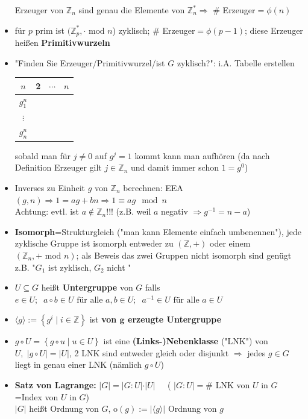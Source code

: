 \documentclass[10pt,a4paper]{article}
\begin{document}
\begin{itemize}
Erzeuger von $\mathbb{Z}_{n}$ sind genau die Elemente von $\mathbb{Z}_{n}^{*}\Rightarrow$ \# Erzeuger$=\phi(n)$ 
\item für $p$ prim ist $(\mathbb{Z}_{p}^{*}, \cdot \text{ mod } n$) zyklisch; \# Erzeuger$=\phi(p-1)$; diese Erzeuger heißen \textbf{Primitivwurzeln}
\item "Finden Sie Erzeuger/Primitivwurzel/ist $G$ zyklisch?": i.A. Tabelle erstellen
\begin{tabular}{c|c c c}
$n$ & 2&$\cdots$ &$n$\\
\hline
$g_{1}^{n}$&&&\\
$\vdots$ &&&\\
$g_{n}^{n}$&&&
\end{tabular}

sobald man für $j\neq0$ auf $g^{j}=1$ kommt kann man aufhören (da nach Definition Erzeuger gilt $j\in \mathbb{Z}_{n}$ und damit immer schon $1=g^{0}$)
\item Inverses zu Einheit $g$ von $\mathbb{Z}_{n}$ berechnen: EEA$(g,n)\Rightarrow 1=ag+bn\Rightarrow 1\equiv ag \mod n$\\
Achtung: evtl. ist $a\notin \mathbb{Z}_{n}$!!! (z.B. weil $a$ negativ $\Rightarrow g^{-1}=n-a$)
\item \textbf{Isomorph}=Strukturgleich ("man kann Elemente einfach umbenennen"), jede zyklische Gruppe ist isomorph entweder zu $(\mathbb{Z},+)$ oder einem $(\mathbb{Z}_{n},+ \text{ mod } n)$; als Beweis das zwei Gruppen nicht isomorph sind genügt z.B. "$G_{1}$ ist zyklisch, $G_{2}$ nicht "
\item $U\subseteq G$ heißt \textbf{Untergruppe} von $G$ falls $e\in U;\;\; a\circ b \in U \text { für alle } a,b\in U;\;\; a^{-1} \in U \text{ für alle } a \in U$ 
\item $\langle g \rangle:=\left\lbrace g^{i}\mid i \in \mathbb{Z}\right\rbrace$ ist \textbf{von $\boldsymbol{g}$ erzeugte Untergruppe}
\item $g \circ U=\left\lbrace g\circ u \mid u \in U \right\rbrace$ ist eine \textbf{(Links-)Nebenklasse} ("LNK") von $U,\; \vert g\circ U\vert =\vert U\vert$, 2 LNK sind entweder gleich oder disjunkt $\Rightarrow$ jedes $g\in G$ liegt in genau einer LNK (nämlich $g\circ U$)
\item \textbf{Satz von Lagrange:} $\vert G \vert = \vert G : U \vert \cdot \vert U \vert\;\;\;\;$  ( $\vert G : U \vert=\#$ LNK von $U$ in $G$=Index von $U$ in $G$)\\ $\vert G \vert$ heißt Ordnung von $G$, o$(g):=\vert \langle g\rangle \vert$ Ordnung von $g$

\end{itemize}
\end{document}
